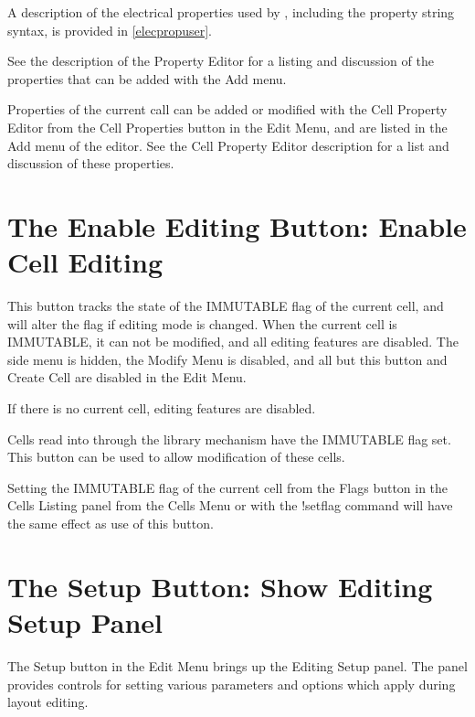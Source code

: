 A description of the electrical properties used by {\Xic}, including
the property string syntax, is provided in \ref{elecpropuser}.

See the description of the {\cb Property Editor} for a listing and
discussion of the properties that can be added with the {\cb Add}
menu.

Properties of the current call can be added or modified with the {\cb
Cell Property Editor} from the {\cb Cell Properties} button in the
{\cb Edit Menu}, and are listed in the {\cb Add} menu of the editor. 
See the {\cb Cell Property Editor} description for a list and
discussion of these properties.


\section{The {\cb Enable Editing} Button: Enable Cell Editing}
This button tracks the state of the IMMUTABLE flag of the current
cell, and will alter the flag if editing mode is changed.  When the
current cell is IMMUTABLE, it can not be modified, and all editing
features are disabled.  The side menu is hidden, the {\cb Modify Menu}
is disabled, and all but this button and {\cb Create Cell} are
disabled in the {\cb Edit Menu}.

If there is no current cell, editing features are disabled.

Cells read into {\Xic} through the library mechanism have the
IMMUTABLE flag set.  This button can be used to allow modification of
these cells.

Setting the IMMUTABLE flag of the current cell from the {\cb Flags}
button in the {\cb Cells Listing} panel from the {\cb Cells Menu} or
with the {\cb !setflag} command will have the same effect as use of
this button.


\section{The {\cb Setup} Button: Show Editing Setup Panel}

The {\cb Setup} button in the {\cb Edit Menu} brings up the {\cb
Editing Setup} panel.  The panel provides controls for setting various
parameters and options which apply during layout editing.


